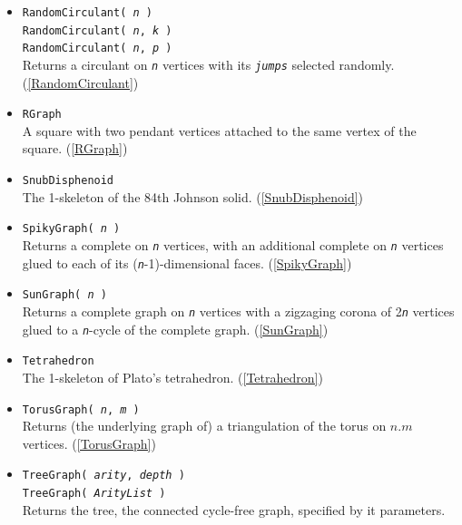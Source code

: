 \documentclass[a4paper,11pt]{report}
\begin{document}
{{\begin{itemize}
 The 3-regular graph on 10 vertices having girth 5. (\ref{PetersenGraph}) 
\item \texttt{RandomCirculant( \mbox{\texttt{\mdseries\slshape n}} )}\\
 \texttt{RandomCirculant( \mbox{\texttt{\mdseries\slshape n}}, \mbox{\texttt{\mdseries\slshape k}} )}\\
 \texttt{RandomCirculant( \mbox{\texttt{\mdseries\slshape n}}, \mbox{\texttt{\mdseries\slshape p}} )}\\
 Returns a circulant on \mbox{\texttt{\mdseries\slshape n}} vertices with its \mbox{\texttt{\mdseries\slshape jumps}} selected randomly. (\ref{RandomCirculant}) 
\item \texttt{RGraph}\\
 A square with two pendant vertices attached to the same vertex of the square.
(\ref{RGraph}) 
\item \texttt{SnubDisphenoid}\\
 The 1-skeleton of the 84th Johnson solid. (\ref{SnubDisphenoid}) 
\item \texttt{SpikyGraph( \mbox{\texttt{\mdseries\slshape n}} )}\\
 Returns a complete on \mbox{\texttt{\mdseries\slshape n}} vertices, with an additional complete on \mbox{\texttt{\mdseries\slshape n}} vertices glued to each of its (\mbox{\texttt{\mdseries\slshape n}}-1)-dimensional faces. (\ref{SpikyGraph}) 
\item \texttt{SunGraph( \mbox{\texttt{\mdseries\slshape n}} )}\\
 Returns a complete graph on \mbox{\texttt{\mdseries\slshape n}} vertices with a zigzaging corona of 2\mbox{\texttt{\mdseries\slshape n}} vertices glued to a \mbox{\texttt{\mdseries\slshape n}}-cycle of the complete graph. (\ref{SunGraph}) 
\item \texttt{Tetrahedron}\\
 The 1-skeleton of Plato's tetrahedron. (\ref{Tetrahedron}) 
\item \texttt{TorusGraph( \mbox{\texttt{\mdseries\slshape n}}, \mbox{\texttt{\mdseries\slshape m}} )}\\
 Returns (the underlying graph of) a triangulation of the torus on $n.m$ vertices. (\ref{TorusGraph}) 
\item \texttt{TreeGraph( \mbox{\texttt{\mdseries\slshape arity}}, \mbox{\texttt{\mdseries\slshape depth}} )}\\
 \texttt{TreeGraph( \mbox{\texttt{\mdseries\slshape ArityList}} )}\\
 Returns the tree, the connected cycle-free graph, specified by it parameters.

\end{itemize}}}
\end{document}
